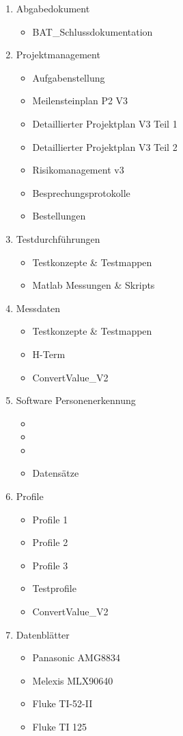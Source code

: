 			\begin{enumerate}
				\item Abgabedokument
				\begin{itemize}
					\item BAT\_Schlussdokumentation
				\end{itemize}
				\item Projektmanagement
				\begin{itemize}
					\item Aufgabenstellung
					\item Meilensteinplan P2 V3
					\item Detaillierter Projektplan V3 Teil 1
					\item Detaillierter Projektplan V3 Teil 2
					\item Risikomanagement v3
					\item Besprechungsprotokolle
					\item Bestellungen
				\end{itemize}
				\item Testdurchführungen
				\begin{itemize}
					\item Testkonzepte \& Testmappen
					\item Matlab Messungen \& Skripts
				\end{itemize}
				\item Messdaten
				\begin{itemize}
					\item Testkonzepte \& Testmappen
					\item H-Term 
					\item ConvertValue\_V2
				\end{itemize}
				\item Software Personenerkennung
				\begin{itemize}
					\item 
					\item 
					\item 
					\item Datensätze
				\end{itemize}
				\item Profile
				\begin{itemize}
					\item Profile 1
					\item Profile 2
					\item Profile 3
					\item Testprofile 
					\item ConvertValue\_V2			
				\end{itemize}
				\item Datenblätter
				\begin{itemize}
					\item Panasonic AMG8834
					\item Melexis MLX90640
					\item Fluke TI-52-II
					\item Fluke TI 125 
				\end{itemize}
			\end{enumerate}
			
			\newpage
			

				
